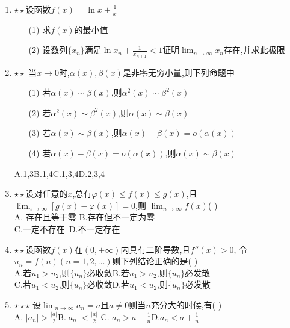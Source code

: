 \documentclass[12pt, a4paper, oneside, UTF8]{ctexbook}
\begin{document}
\begin{enumerate}
    \item $\star\star$设函数$f(x)=\ln{x}+\frac{1}{x}$ 
    \begin{enumerate}
        \item [(1)] 求$f(x)$的最小值 
        \item [(2)] 设数列$\{x_n\}$满足$\ln{x_n}+\frac{1}{x_{n+1}}<1$证明$\displaystyle\lim_{n\to\infty}x_n$存在,并求此极限
    \end{enumerate}

    \item $\star\star$ 当$x\to 0$时,$\alpha(x),\beta(x)$是非零无穷小量,则下列命题中 
    \begin{enumerate}
        \item [(1)] 若$\alpha(x)\sim\beta(x)$,则$\alpha^2(x)\sim\beta^2(x)$ 
        \item [(2)] 若$\alpha^2(x)\sim\beta^2(x)$,则$\alpha(x)\sim\beta(x)$
        \item [(3)] 若$\alpha(x)\sim\beta(x)$,则$\alpha(x)-\beta(x)=o(\alpha(x))$
        \item [(4)] 若$\alpha(x)-\beta(x)=o(\alpha(x))$,则$\alpha(x)\sim\beta(x)$
    \end{enumerate}
    A.1,3\qquad B.1,4\qquad C.1,3,4\qquad D.2,3,4 

    \item $\star\star$设对任意的$x$,总有$\varphi(x)\leq f(x)\leq g(x)$,且$\displaystyle \lim_{n\to\infty}\left[g(x)-\varphi(x)\right]=0$,则
    $\displaystyle\lim_{n\to\infty}f(x)$(   )  \\
    A. 存在且等于零 \qquad B.存在但不一定为零 \\
    C.一定不存在\qquad\quad\ D.不一定存在 

    \item $\star\star$设函数$f(x)$在$(0,+\infty)$内具有二阶导数,且$f''(x)>0$,
    令$u_n=f(n)(n=1,2,\ldots)$则下列结论正确的是(  ) \\
    A.若$u_1>u_2$,则$\{u_n\}$必收敛\qquad B.若$u_1>u_2$,则$\{u_n\}$必发散\\
    C.若$u_1<u_2$,则$\{u_n\}$必收敛\qquad D.若$u_1<u_2$,则$\{u_n\}$必发散

    \item $\star\star\star$ 设$\displaystyle\lim_{n\to\infty}a_n=a$且$a\neq 0$则当$n$充分大的时候,有(   )\\
    A. $\left|a_n\right|>\frac{\left|a\right|}{2}$\qquad B.$\left|a_n\right|<\frac{\left|a\right|}{2}$\qquad
    C. $a_n>a-\frac{1}{n}$\qquad D.$a_n<a+\frac{1}{n}$


\end{enumerate}
\end{document}
